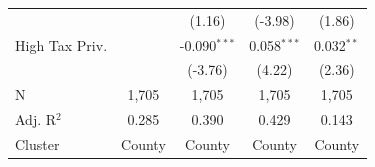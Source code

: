 \begin{tabular*}{\textwidth}{@{\extracolsep{\fill}}lcccc}
                              &                & (1.16)         & (-3.98)        & (1.86)\\   
   High Tax Priv.             &                & -0.090$^{***}$ & 0.058$^{***}$  & 0.032$^{**}$\\   
                              &                & (-3.76)        & (4.22)         & (2.36)\\   
   \hline
   N               & 1,705          & 1,705          & 1,705          & 1,705\\  
   Adj. R$^2$             & 0.285          & 0.390          & 0.429          & 0.143\\  
   Cluster              & County & County & County & County\\  
   \bottomrule
\end{tabular*}
\par\endgroup
